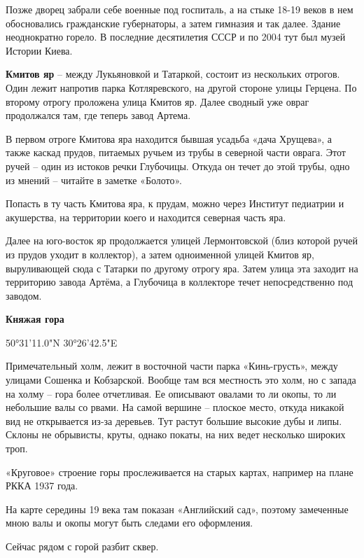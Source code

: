 Позже дворец забрали себе военные под госпиталь, а на стыке 18-19 веков в нем обосновались гражданские губернаторы, а затем гимназия и так далее. Здание неоднократно горело. В последние десятилетия СССР и по 2004 тут был музей Истории Киева.\\

\medskip

\textbf{Кмитов яр} – между Лукьяновкой и Татаркой, состоит из нескольких отрогов. Один 
лежит напротив парка Котляревского, на другой стороне улицы Герцена. По второму отрогу проложена улица Кмитов яр. Далее сводный уже овраг продолжался там, где теперь завод Артема.

В первом отроге Кмитова яра находится бывшая усадьба «дача Хрущева», а также каскад прудов, питаемых ручьем из трубы в северной части оврага. Этот ручей – один из истоков речки Глубочицы. Откуда он течет до этой трубы, одно из мнений – читайте в заметке «Болото». 

Попасть в ту часть Кмитова яра, к прудам, можно через Институт педиатрии и акушерства, на территории коего и находится северная часть яра.

Далее на юго-восток яр продолжается улицей Лермонтовской (близ которой ручей из прудов уходит в коллектор), а затем одноименной улицей Кмитов яр, выруливающей сюда с Татарки по другому отрогу яра. Затем улица эта заходит на территорию завода Артёма, а Глубочица в коллекторе течет непосредственно под заводом.\\

\medskip


\textbf{Княжая гора} 

50°31'11.0"N 30°26'42.5"E

Примечательный холм, лежит в восточной части парка «Кинь-грусть», между улицами Сошенка и Кобзарской. Вообще там вся местность это холм, но с запада на холму – гора более отчетливая. Ее описывают овалами то ли окопы, то ли небольшие валы со рвами. На самой вершине – плоское место, откуда никакой вид не открывается из-за деревьев. Тут растут большие высокие дубы и липы. Склоны не обрывисты, круты, однако покаты, на них ведет несколько широких троп. 

«Круговое» строение горы прослеживается на старых картах, например на плане РККА 1937 года.

На карте середины 19 века там показан «Английский сад», поэтому замеченные мною валы и окопы могут быть следами его оформления.

Сейчас рядом с горой разбит сквер.\\

